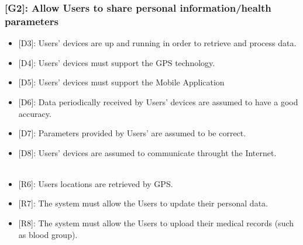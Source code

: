 \documentclass[12pt,a4paper]{article}
\begin{document}
		\subsubsection*{{[}{G2}{]}: Allow Users to share personal information/health parameters}
			\begin{itemize}
				\begin{itemize}
					\item {[D3]}: Users' devices are up and running in order to retrieve and process data.
					\item {[D4]}: Users' devices must support the GPS technology.
					\item {[D5]}: Users' devices must support the Mobile Application
					\item {[D6]}: Data periodically received by Users' devices are assumed to have a good accuracy. 
					\item {[D7]}: Parameters provided by Users' are assumed to be correct. 
					\item {[D8]}: Users' devices are assumed to communicate throught the Internet.
					\\\\
					\item {[R6]}: Users locations are retrieved by GPS.
					\item {[R7]}: The system must allow the Users to update their personal data.
					\item {[R8]}: The system must allow the Users to upload their medical records (such as blood group).
				\end{itemize} 
			\end{itemize}
\end{document}
